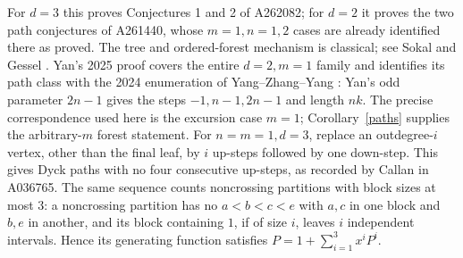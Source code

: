\documentclass[11pt]{article}
\begin{document}
For $d=3$ this proves Conjectures 1 and 2 of A262082; for $d=2$ it
proves the two path conjectures of A261440, whose $m=1,n=1,2$ cases
are already identified there as proved.
The tree and ordered-forest mechanism is classical; see
Sokal \cite[Propositions 3.1--3.2, equations (3.4), (3.6)]{sokal}
and Gessel \cite[Section 4.5]{gessel}. Yan's 2025 proof covers
the entire $d=2,m=1$ family \cite[Section 5, Corollary 5.2(D1)]{yan}
and identifies its path class with the 2024 enumeration of
Yang--Zhang--Yang \cite{yang}:
Yan's odd parameter $2n-1$ gives the steps $-1,n-1,2n-1$ and
length $nk$. The precise correspondence used here is the excursion
case $m=1$; Corollary~\ref{paths} supplies the arbitrary-$m$ forest statement.
For $n=m=1,d=3$, replace an outdegree-$i$ vertex, other than the final
leaf, by $i$ up-steps followed by one down-step. This gives Dyck paths
with no four consecutive up-steps, as recorded by Callan in A036765.
The same sequence counts noncrossing partitions with block sizes at
most $3$: a noncrossing partition has no $a<b<c<e$ with $a,c$ in one
block and $b,e$ in another, and its block containing $1$, if of size $i$,
leaves $i$ independent intervals. Hence its generating function satisfies
$P=1+\sum_{i=1}^3x^iP^i$.
\end{document}
